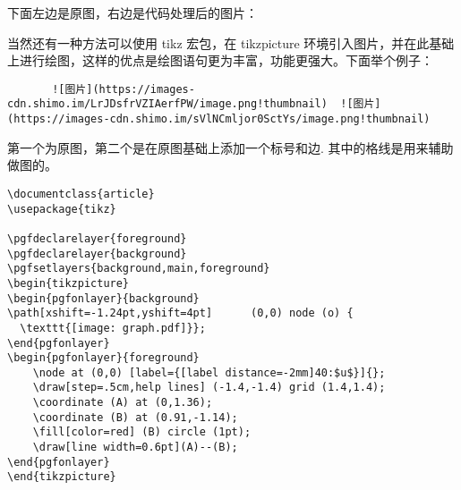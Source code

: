 下面左边是原图，右边是代码处理后的图片：

当然还有一种方法可以使用 tikz 宏包，在 tikzpicture
环境引入图片，并在此基础上进行绘图，这样的优点是绘图语句更为丰富，功能更强大。下面举个例子：

\begin{verbatim}
       ![图片](https://images-cdn.shimo.im/LrJDsfrVZIAerfPW/image.png!thumbnail)  ![图片](https://images-cdn.shimo.im/sVlNCmljor0SctYs/image.png!thumbnail)
\end{verbatim}

第一个为原图，第二个是在原图基础上添加一个标号和边.
其中的格线是用来辅助做图的。

\begin{verbatim}
\documentclass{article}
\usepackage{tikz}

\pgfdeclarelayer{foreground}
\pgfdeclarelayer{background}
\pgfsetlayers{background,main,foreground}
\begin{tikzpicture}
\begin{pgfonlayer}{background}
\path[xshift=-1.24pt,yshift=4pt]      (0,0) node (o) {
  \texttt{[image: graph.pdf]}};
\end{pgfonlayer}
\begin{pgfonlayer}{foreground}
    \node at (0,0) [label={[label distance=-2mm]40:$u$}]{};
    \draw[step=.5cm,help lines] (-1.4,-1.4) grid (1.4,1.4);
    \coordinate (A) at (0,1.36);
    \coordinate (B) at (0.91,-1.14);
    \fill[color=red] (B) circle (1pt);
    \draw[line width=0.6pt](A)--(B);
\end{pgfonlayer}
\end{tikzpicture}

\end{verbatim}
